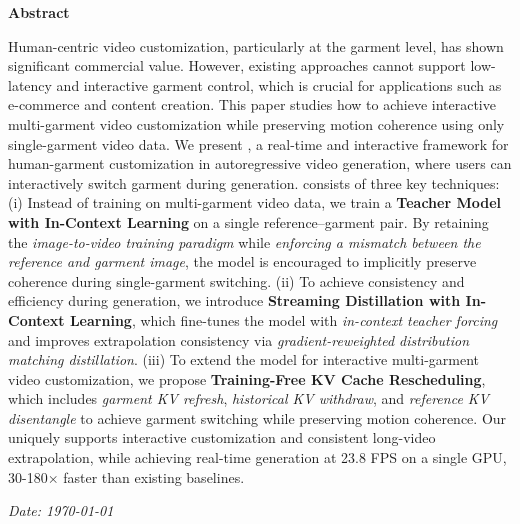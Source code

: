 %
\newenvironment{customabstract}{
    \begin{tcolorbox}[
        enhanced,
        colframe=taobaocolor,
        colback=white,
        boxrule=0.7pt,
        arc=12pt,
        auto outer arc,
        left=15pt,
        right=15pt,
        top=10pt,
        bottom=15pt,
        breakable
    ]
    \begin{center}
        \Large\bfseries\color{taobaocolor} Abstract
    \end{center}
    \vspace{0.2em}
}{
    \par\vspace{1em}
    \hfill \textit{Date: \today} %
    \end{tcolorbox}
}

\begin{customabstract}
%
Human-centric video customization, particularly at the garment level, has shown significant commercial value. However, existing approaches cannot support low-latency and interactive garment control, which is crucial for applications such as e-commerce and content creation.
% 
This paper studies how to achieve interactive multi-garment video customization while preserving motion coherence using only single-garment video data.
% 
We present \textbf{\method}, a real-time and interactive framework for human-garment customization in autoregressive video generation, where users can interactively switch garment during generation.
\method consists of three key techniques:
% 
(i) Instead of training on multi-garment video data, we train a \textbf{Teacher Model with In-Context Learning} on a single reference–garment pair. By retaining the \textit{image-to-video training paradigm} while \textit{enforcing a mismatch between the reference and garment image}, the model is encouraged to implicitly preserve coherence during single-garment switching.
% 
(ii) To achieve consistency and efficiency during generation, we introduce \textbf{Streaming Distillation with In-Context Learning}, which fine-tunes the model with \textit{in-context teacher forcing} and improves extrapolation consistency via \textit{gradient-reweighted distribution matching distillation}.
% 
(iii) To extend the model for interactive multi-garment video customization, we propose \textbf{Training-Free KV Cache Rescheduling}, which includes \textit{garment KV refresh}, \textit{historical KV withdraw}, and \textit{reference KV disentangle} to achieve garment switching while preserving motion coherence.
% 
Our \method uniquely supports interactive customization and consistent long-video extrapolation, while achieving real-time generation at 23.8 FPS on a single GPU, 30-180$\times$ faster than existing baselines.
% 
\end{customabstract}

